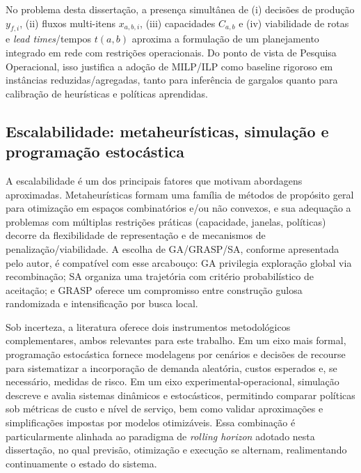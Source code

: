 No problema desta dissertação, a presença simultânea de (i) decisões de produção \(y_{f,i}\), (ii) fluxos multi-itens \(x_{a,b,i}\), (iii) capacidades \(C_{a,b}\) e (iv) viabilidade de rotas e \emph{lead times}/tempos \(t(a,b)\) aproxima a formulação de um planejamento integrado em rede com restrições operacionais. Do ponto de vista de Pesquisa Operacional, isso justifica a adoção de MILP/ILP como baseline rigoroso em instâncias reduzidas/agregadas, tanto para inferência de gargalos quanto para calibração de heurísticas e políticas aprendidas. \cite{Shapiro2001ModelingSupplyChain,AhujaMagnantiOrlin1993NetworkFlows}

\subsection{Escalabilidade: metaheurísticas, simulação e programação estocástica}

A escalabilidade é um dos principais fatores que motivam abordagens aproximadas. Metaheurísticas formam uma família de métodos de propósito geral para otimização em espaços combinatórios e/ou não convexos, e sua adequação a problemas com múltiplas restrições práticas (capacidade, janelas, políticas) decorre da flexibilidade de representação e de mecanismos de penalização/viabilidade. \cite{Talbi2009Metaheuristics} A escolha de GA/GRASP/SA, conforme apresentada pelo autor, é compatível com esse arcabouço: GA privilegia exploração global via recombinação; SA organiza uma trajetória com critério probabilístico de aceitação; e GRASP oferece um compromisso entre construção gulosa randomizada e intensificação por busca local.

Sob incerteza, a literatura oferece dois instrumentos metodológicos complementares, ambos relevantes para este trabalho. Em um eixo mais formal, programação estocástica fornece modelagens por cenários e decisões de recourse para sistematizar a incorporação de demanda aleatória, custos esperados e, se necessário, medidas de risco. \cite{BirgeLouveaux2011StochasticProgramming} Em um eixo experimental-operacional, simulação descreve e avalia sistemas dinâmicos e estocásticos, permitindo comparar políticas sob métricas de custo e nível de serviço, bem como validar aproximações e simplificações impostas por modelos otimizáveis. \cite{Law2015SimulationModeling} Essa combinação é particularmente alinhada ao paradigma de \emph{rolling horizon} adotado nesta dissertação, no qual previsão, otimização e execução se alternam, realimentando continuamente o estado do sistema.

